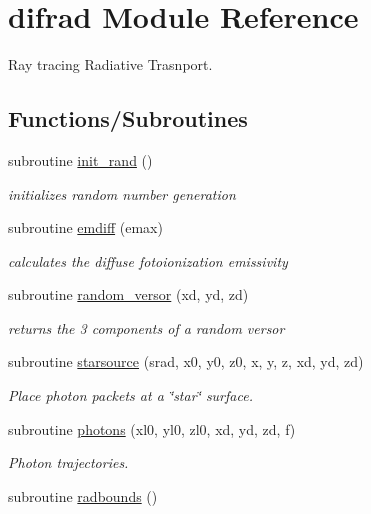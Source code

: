 \hypertarget{namespacedifrad}{}\section{difrad Module Reference}
\label{namespacedifrad}


Ray tracing Radiative Trasnport.  


\subsection*{Functions/\+Subroutines}
\begin{DoxyCompactItemize}
\item 
subroutine \hyperlink{namespacedifrad_a9bce19025195159710828548c95282dc}{init\+\_\+rand} ()
\begin{DoxyCompactList}\small\item\em initializes random number generation \end{DoxyCompactList}\item 
subroutine \hyperlink{namespacedifrad_a1ccb144621689571d836f2f76c5fabae}{emdiff} (emax)
\begin{DoxyCompactList}\small\item\em calculates the diffuse fotoionization emissivity \end{DoxyCompactList}\item 
subroutine \hyperlink{namespacedifrad_ac7efbacd89420f5c298f7fb666ba14f9}{random\+\_\+versor} (xd, yd, zd)
\begin{DoxyCompactList}\small\item\em returns the 3 components of a random versor \end{DoxyCompactList}\item 
subroutine \hyperlink{namespacedifrad_a180fbbe2c9b0639cc33dd6ef57a61ec4}{starsource} (srad, x0, y0, z0, x, y, z, xd, yd, zd)
\begin{DoxyCompactList}\small\item\em Place photon packets at a \char`\"{}star\char`\"{} surface. \end{DoxyCompactList}\item 
subroutine \hyperlink{namespacedifrad_a39291c8aa2927c69ef6ca60f78c9b103}{photons} (xl0, yl0, zl0, xd, yd, zd, f)
\begin{DoxyCompactList}\small\item\em Photon trajectories. \end{DoxyCompactList}\item 
subroutine \hyperlink{namespacedifrad_afe6e9d2182e755ae483aeaa2c91f2710}{radbounds} ()

\end{DoxyCompactItemize}
